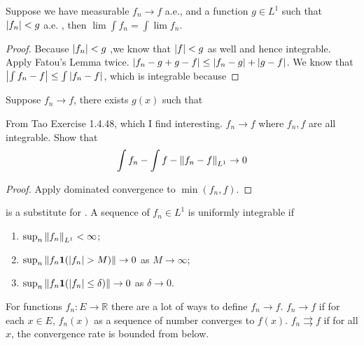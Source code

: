 \begin{thm}
    Suppose we have measurable \(f_{n} \to f\) a.e., and a function \(g \in L^{1}\) such that \(\abs{f_{n}} < g\) a.e. , then \(\lim \int f_{n} = \int \lim f_{n}\). 
\end{thm}

\begin{proof}
    Because \(\abs{f_{n}} < g\) ,we know that \(\abs{f} < g\) as well and hence integrable.
    Apply Fatou's Lemma twice. \(\abs{f_{n} - g + g - f} \leq \abs{f_{n} - g} + \abs{g - f}\). 
    We know that \(\abs{\int f_{n} - f} \leq \int \abs{f_{n} - f} \), which is integrable because  
\end{proof}

\begin{thm}
    Suppose \(f_{n} \to f\), there exists \(g(x)\) such that 
\end{thm}
\begin{proposition}
    From Tao Exercise 1.4.48, which I find interesting. \(f_{n} \to f\) where \(f_{n}, f\) are all integrable. Show that 
    \begin{equation*}
        \int f_{n} - \int f - \norm{f_{n} - f}_{L^{1}} \to 0
    \end{equation*}
\end{proposition}
\begin{proof}
    Apply dominated convergence to \(\min(f_{n}, f)\).
\end{proof}

 is a substitute for . A sequence of \(f_{n} \in L^{1}\) is uniformly integrable if
\begin{enumerate}
    \item \(\sup_{n} \norm{f_{n}}_{L^{1}} < \infty\);
    \item \(\sup_{n} \norm{f_{n} \mathbf{1}(\abs{f_{n}}> M)} \to 0\) as \(M \to \infty\);
    \item \(\sup_{n} \norm{f_{n} \mathbf{1}(\abs{f_{n}}\leq \delta)} \to 0\) as \(\delta \to 0\).
\end{enumerate} 

For functions \(f_{n}: E \to \mathbb{R}\) there are a lot of ways to define \(f_{n} \to f\). 
\(f_{n} \to f\)  if for each \(x \in E\), \(f_{n}(x)\) as a sequence of number converges to \(f(x)\). \(f_{n} \rightrightarrows f\) if for all \(x\), the convergence rate is bounded from below. 


